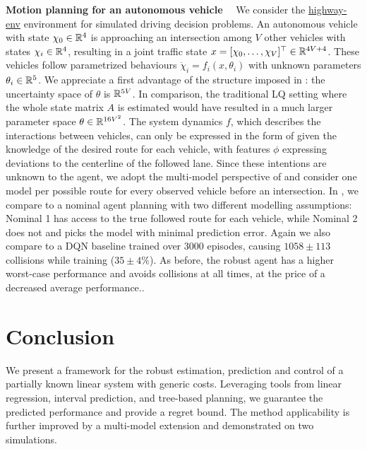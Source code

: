 \documentclass{article}
\begin{document}
\textbf{Motion planning for an autonomous vehicle}~~
We consider the \href{https://github.com/eleurent/highway-env}{highway-env} environment \citep{highway-env} for simulated driving decision problems. An autonomous vehicle with state $\chi_0\in\mathbb{R}^4$ is approaching an intersection among $V$ other vehicles with states $\chi_i\in\mathbb{R}^4$, resulting in a joint traffic state $x = [\chi_0, \dots,\chi_V]^\top\in\mathbb{R}^{4V+4}$. These vehicles follow parametrized behaviours $\dot{\chi}_i=f_i(x,\theta_i)$ with unknown parameters $\theta_i\in\mathbb{R}^5$. We appreciate a first advantage of the structure imposed in : the uncertainty space of $\theta$ is $\mathbb{R}^{5V}$. In comparison, the traditional LQ setting where the whole state matrix $A$ is estimated would have resulted in a much larger parameter space $\theta\in\mathbb{R}^{16V^2}$.
The system dynamics $f$, which describes the interactions between vehicles, can only be expressed in the form of  given the knowledge of the desired route for each vehicle, with features $\phi$ expressing deviations to the centerline of the followed lane. Since these intentions are unknown to the agent, we adopt the multi-model perspective of  and consider one model per possible route for every observed vehicle before an intersection. In , we compare  to a nominal agent planning with two different modelling assumptions: Nominal 1 has access to the true followed route for each vehicle, while Nominal 2 does not and picks the model with minimal prediction error. Again we also compare to a DQN baseline trained over 3000 episodes, causing $1058\pm113$ collisions while training ($35\pm4\%$). As before, the robust agent has a higher worst-case performance and avoids collisions at all times, at the price of a decreased average performance..

\section*{Conclusion}

We present a framework for the robust estimation, prediction and control of a partially known linear system with generic costs. Leveraging tools from linear regression, interval prediction, and tree-based planning, we guarantee the predicted performance and provide a regret bound. The method applicability is further improved by a multi-model extension and demonstrated on two simulations.
\end{document}
